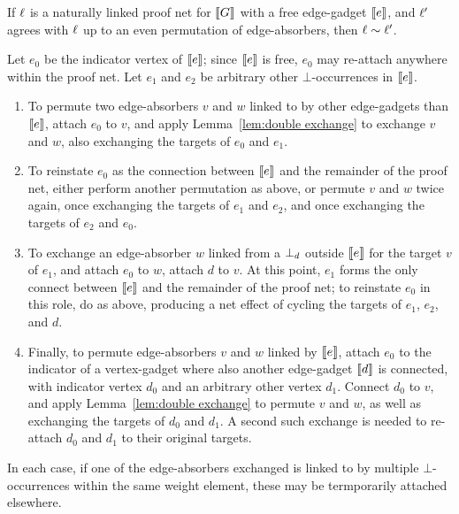 \documentclass[conference,onecolumn]{IEEEtran}
\begin{document}
\begin{lemma}
\label{lem:permute edge-absorbers}
If $\ell$ is a naturally linked proof net for $\llbracket G\rrbracket$ with a free edge-gadget $\llbracket e\rrbracket$, and $\ell'$ agrees with $\ell$ up to an even permutation of edge-absorbers, then $\ell\sim\ell'$.
\end{lemma}

\begin{IEEEproof}
Let $e_0$ be the indicator vertex of $\llbracket e\rrbracket$; since $\llbracket e\rrbracket$ is free, $e_0$ may re-attach anywhere within the proof net.
%
Let $e_1$ and $e_2$ be arbitrary other $\bot$-occurrences in $\llbracket e\rrbracket$.

\begin{enumerate}

	\item
To permute two edge-absorbers $v$ and $w$ linked to by other edge-gadgets than $\llbracket e\rrbracket$, attach $e_0$ to $v$, and apply Lemma~\ref{lem:double exchange} to exchange $v$ and $w$, also exchanging the targets of $e_0$ and $e_1$.

	\item
To reinstate $e_0$ as the connection between $\llbracket e\rrbracket$ and the remainder of the proof net, either perform another permutation as above, or permute $v$ and $w$ twice again, once exchanging the targets of $e_1$ and $e_2$, and once exchanging the targets of $e_2$ and $e_0$.

	\item
To exchange an edge-absorber $w$ linked from a $\bot_{d}$ outside $\llbracket e\rrbracket$ for the target $v$ of $e_1$, and attach $e_0$ to $w$, attach $d$ to $v$.
%
At this point, $e_1$ forms the only connect between $\llbracket e\rrbracket$ and the remainder of the proof net; to reinstate $e_0$ in this role, do as above, producing a net effect of cycling the targets of $e_1$, $e_2$, and $d$.

	\item
Finally, to permute edge-absorbers $v$ and $w$ linked by $\llbracket e\rrbracket$, attach $e_0$ to the indicator of a vertex-gadget where also another edge-gadget $\llbracket d\rrbracket$ is connected, with indicator vertex $d_0$ and an arbitrary other vertex $d_1$.
%
Connect $d_0$ to $v$, and apply Lemma~\ref{lem:double exchange} to permute $v$ and $w$, as well as exchanging the targets of $d_0$ and $d_1$.
%
A second such exchange is needed to re-attach $d_0$ and $d_1$ to their original targets.

\end{enumerate}

In each case, if one of the edge-absorbers exchanged is linked to by multiple $\bot$-occurrences within the same weight element, these may be termporarily attached elsewhere.

\end{IEEEproof}
\end{document}

